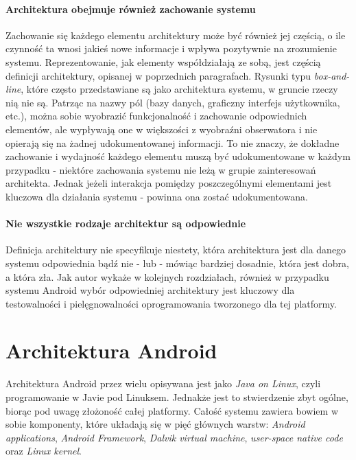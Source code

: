 \paragraph{Architektura obejmuje również zachowanie systemu}
Zachowanie się każdego elementu architektury może być również jej częścią, o ile czynność ta wnosi jakieś nowe informacje i wpływa pozytywnie na zrozumienie systemu. Reprezentowanie, jak elementy współdziałają ze sobą, jest częścią definicji architektury, opisanej w poprzednich paragrafach. Rysunki typu \textit{box-and-line}, które często przedstawiane są jako architektura systemu, w gruncie rzeczy nią nie są. Patrząc na nazwy pól (bazy danych, graficzny interfejs użytkownika, etc.), można sobie wyobrazić funkcjonalność i zachowanie odpowiednich elementów, ale wypływają one w większości z wyobraźni obserwatora i nie opierają się na żadnej udokumentowanej informacji. To nie znaczy, że dokładne zachowanie i wydajność każdego elementu muszą być udokumentowane w każdym przypadku - niektóre zachowania systemu nie leżą w grupie zainteresowań architekta. Jednak jeżeli interakcja pomiędzy poszczególnymi elementami jest kluczowa dla działania systemu - powinna ona zostać udokumentowana.

\paragraph{Nie wszystkie rodzaje architektur są odpowiednie}
Definicja architektury nie specyfikuje niestety, która architektura jest dla danego systemu odpowiednia bądź nie - lub - mówiąc bardziej dosadnie, która jest dobra, a która zła. Jak autor wykaże w kolejnych rozdziałach, również w przypadku systemu Android wybór odpowiedniej architektury jest kluczowy dla testowalności i pielęgnowalności  oprogramowania tworzonego dla tej platformy.

\section{Architektura Android}
Architektura Android przez wielu opisywana jest jako \textit{Java on Linux}, czyli programowanie w Javie pod Linuksem. Jednakże jest to stwierdzenie zbyt ogólne, biorąc pod uwagę złożoność całej platformy. Całość systemu zawiera bowiem w sobie komponenty, które układają się w pięć głównych warstw: \textit{Android applications}, \textit{Android Framework}, \textit{Dalvik virtual machine}, \textit{user-space native code} oraz \textit{Linux kernel}\cite{bib:hacker:handbook}.

